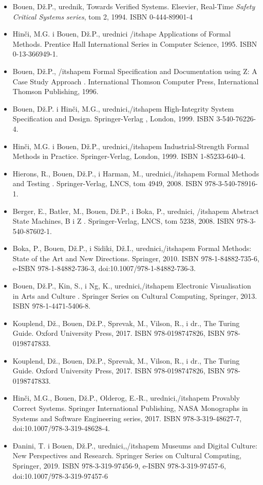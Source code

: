 \documentclass[a4paper]{article}
\begin{document}
\begin{itemize}
\item Bouen, Dž.P., urednik, Towards Verified Systems. Elsevier, Real-Time {\itshape Safety Critical Systems series}, tom 2, 1994. ISBN 0-444-89901-4
\item Hinči, M.G. i Bouen, Dž.P., urednici {/itshape Applications of Formal Methods}. Prentice Hall International Series in Computer Science, 1995. ISBN 0-13-366949-1.
\item Bouen, Dž.P., {/itshapem Formal Specification and Documentation using Z: A Case Study Approach }. International Thomson Computer Press, International Thomson Publishing, 1996. 
\item Bouen, Dž.P. i Hinči, M.G., urednici,{/itshapem High-Integrity System Specification and Design. }Springer-Verlag , London, 1999. ISBN 3-540-76226-4.
\item Hinči, M.G. i Bouen, Dž.P., urednici,{/itshapem Industrial-Strength Formal Methods in Practice. } Springer-Verlag, London, 1999. ISBN 1-85233-640-4.
\item Hierons, R., Bouen, Dž.P., i Harman, M., urednici,{/itshapem  Formal Methods and Testing} . Springer-Verlag, LNCS, tom 4949, 2008. ISBN 978-3-540-78916-1.
\item Berger, E., Batler, M., Bouen, Dž.P., i Boka, P., urednici, {/itshapem Abstract State Machines, B i Z }. Springer-Verlag, LNCS, tom 5238, 2008. ISBN 978-3-540-87602-1.
\item Boka, P., Bouen, Dž.P., i Sidiki, Dž.I., urednici,{/itshapem Formal Methods: State of the Art and New Directions}. Springer, 2010. ISBN 978-1-84882-735-6, e-ISBN 978-1-84882-736-3, doi:10.1007/978-1-84882-736-3.
\item Bouen, Dž.P., Kin, S., i Ng, K., urednici,{/itshapem Electronic Visualisation in Arts and Culture} . Springer Series on Cultural Computing, Springer, 2013. ISBN 978-1-4471-5406-8.
\item Kouplend, Dž., Bouen, Dž.P., Sprevak, M., Vilson, R., i dr., The Turing Guide. Oxford University Press, 2017. ISBN 978-0198747826, ISBN 978-0198747833.
\item Kouplend, Dž., Bouen, Dž.P., Sprevak, M., Vilson, R., i dr., The Turing Guide. Oxford University Press, 2017. ISBN 978-0198747826, ISBN 978-0198747833.
\item Hinči, M.G., Bouen, Dž.P., Olderog, E.-R., urednici,{/itshapem Provably Correct Systems}. Springer International Publishing, NASA Monographs in Systems and Software Engineering series, 2017. ISBN 978-3-319-48627-7, doi:10.1007/978-3-319-48628-4.
\item Đanini, T. i Bouen, Dž.P., urednici,,{/itshapem Museums and Digital Culture: New Perspectives and Research}. Springer Series on Cultural Computing, Springer, 2019. ISBN 978-3-319-97456-9, e-ISBN 978-3-319-97457-6, doi:10.1007/978-3-319-97457-6
\end{itemize}
\end{document}
